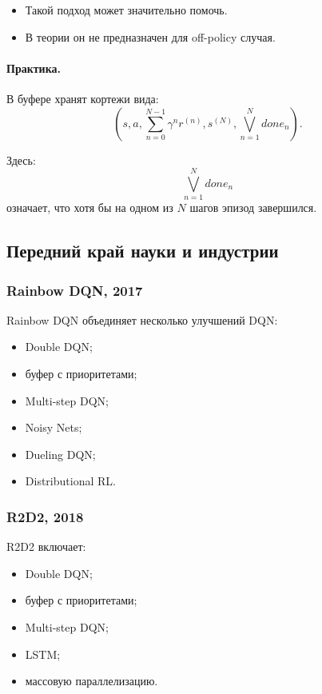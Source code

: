 \documentclass[12pt,a4paper]{article}
\begin{document}
\begin{itemize}
    \item Такой подход может значительно помочь.
    \item В теории он не предназначен для off-policy случая.
\end{itemize}

\paragraph{Практика.}

В буфере хранят кортежи вида:
\[
\left(
s,
a,
\sum_{n=0}^{N-1}
\gamma^n r^{(n)},
s^{(N)},
\bigvee_{n=1}^{N} done_n
\right).
\]

Здесь:
\[
\bigvee_{n=1}^{N} done_n
\]
означает, что хотя бы на одном из $N$ шагов эпизод завершился.

\subsection{Передний край науки и индустрии}

\subsubsection{Rainbow DQN, 2017}

Rainbow DQN объединяет несколько улучшений DQN:
\begin{itemize}
    \item Double DQN;
    \item буфер с приоритетами;
    \item Multi-step DQN;
    \item Noisy Nets;
    \item Dueling DQN;
    \item Distributional RL.
\end{itemize}

\subsubsection{R2D2, 2018}

R2D2 включает:
\begin{itemize}
    \item Double DQN;
    \item буфер с приоритетами;
    \item Multi-step DQN;
    \item LSTM;
    \item массовую параллелизацию.
\end{itemize}
\end{document}
